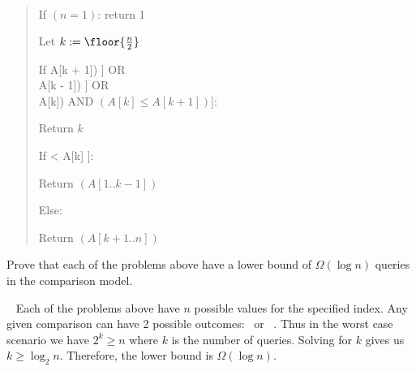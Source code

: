\documentclass[10pt]{article}
\begin{document}
\begin{solution}\ %
\begin{quote}%
\noindent{}%

%

\begin{steps}
\item If \( (n = 1) \): return 1 
\item Let \( k := \floor{\frac{n}{2}} \)
\item If \big[\( (k = 1) \) AND \( (A[k] \leq A[k + 1]) \)\big] OR \\
  \nf{\quad}\big[\( (k = n) \) AND \( \big(A[k] \leq A[k - 1]\big) \)\big] OR \\
  \nf{\quad}\big[\( (1 < k < n) \) AND \( (A[k - 1] \geq A[k]) \) AND \( (A[k] \leq A[k + 1]) \)\big]: 
  \begin{steps}
  \item Return \( k \)
  \end{steps}
\item If \big[\( (k > 1) \)  AND \( A[k-1] < A[k] \)\big]:
  \begin{steps}
  \item Return \( (A[1..k-1]) \)
  \end{steps}
\item Else:
  \begin{steps}
  \item Return \( (A[k+1..n]) \)
  \end{steps}
\end{steps}
\end{quote}
\end{solution}
\pagebreak

Prove that each of the problems above have a lower bound of \( \Omega(\log n) \) queries in the comparison model.

\begin{solution}\ %
Each of the problems above have \( n \) possible values for the specified index. Any given comparison can have 2 possible outcomes: \boolT~or \boolF~. Thus in the worst case scenario we have \( 2^k \geq n \) where \( k \) is the number of queries. Solving for \( k \) gives us \( k \geq \log_2 n \). Therefore, the lower bound is \( \Omega(\log n) \).
\end{solution}
\pagebreak
\end{document}
